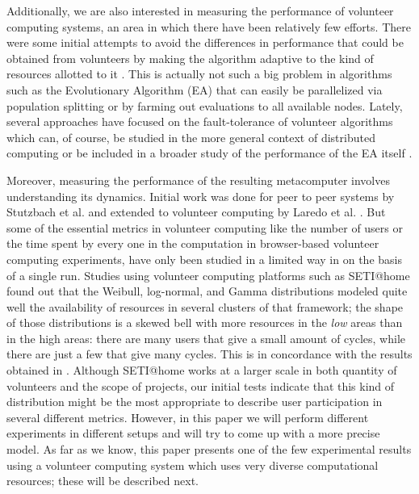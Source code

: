 \documentclass{sig-alternate}
\begin{document}
Additionally, we are also interested in measuring the performance
of volunteer computing systems, an area in which there have been
relatively few efforts. There were some initial attempts to avoid the differences in performance
that could be obtained from volunteers  by making
the algorithm adaptive to the kind of resources allotted to it
\cite{milani2004online}. This is actually not such a big problem in
algorithms such as the Evolutionary Algorithm (EA) that can easily be
parallelized via population splitting or by farming out evaluations to all
available nodes. Lately, several approaches have focused on the
fault-tolerance of volunteer algorithms
\cite{gonzalez2010characterizing} which can, of course, be studied in
the more general context of distributed computing 
\cite{nogueras2015studying} or be included in a broader study of the
performance of the EA itself
\cite{DBLP:journals/gpem/LaredoBGVAGF14}.

Moreover, measuring the performance of the resulting metacomputer
involves understanding its dynamics. Initial
work was done for peer to peer systems by Stutzbach et
al. \cite{stutzbach2006understanding} and extended to volunteer
computing by Laredo et al. \cite{churn08,laredo2008rcp}. 
But some of the essential metrics in volunteer computing like the
number of users or the time spent by every one in the
computation in browser-based volunteer computing experiments, have
only been studied in a limited way in 
\cite{DBLP:journals/gpem/LaredoBGVAGF14} on the basis of a single
run. Studies using volunteer computing platforms such as SETI@home
\cite{javadi2009mining} found out that the Weibull, log-normal, and
Gamma distributions 
modeled quite well the availability of resources in several clusters
of that framework; the shape of those distributions is a skewed bell
with more resources in the {\em low} areas than in the high areas:
there are many users that give a small amount of cycles, while there
are just a few that give many cycles. This is in concordance with the
results obtained in \cite{agajaj}. %
Although SETI@home works
at a larger scale in both quantity of volunteers and the scope of projects, 
our initial tests indicate that
this kind of distribution might be the most appropriate to describe
user participation in several different metrics. However, in this
paper we will perform different experiments in different setups and
will try to come up with a more precise model. 
As far as we know, this paper presents one of the few experimental
results using a volunteer computing system which uses  %
very diverse computational resources; these will be described next.
\end{document}
